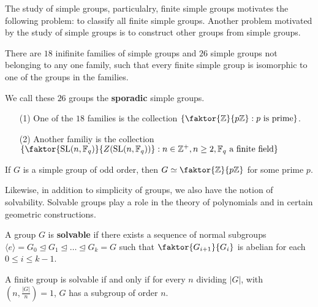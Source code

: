 The study of simple groups, particulalry, finite simple groups motivates the
following problem: to classify all finite simple groups. Another problem
motivated by the study of simple groups is to construct other groups from simple
groups.

\begin{theorem}\label{theorem_3.5.3}
  There are $18$ inifinite families of simple groups and $26$ simple groups
  not belonging to any one family, such that every finite simple group is
  isomorphic to one of the groups in the families.
\end{theorem}
\begin{remark}
  We call these $26$ groups the \textbf{sporadic} simple groups.
\end{remark}

\begin{example}\label{example_3.10}
  \begin{enumerate}
    \item[(1)] One of the $18$ families is the collection
      $\{\faktor{\Z}{p\Z} : p \text{ is prime}\}$.

    \item[(2)] Another familiy is the collection
      $\{\faktor{\SL(n,\F_q)}{Z(\SL(n, \F_q))} : n \in \Z^+, n \geq 2,\F_q \text{
      a finite field} \}$
  \end{enumerate}
\end{example}

\begin{theorem}\label{theorem_3.5.4}
  If $G$ is a simple group of odd order, then $G \simeq \faktor{\Z}{p\Z}$ for
  some prime $p$.
\end{theorem}

Likewise, in addition to simplicity of groups, we also have the notion of
solvability. Solvable groups play a role in the theory of polynomials and in
certain geometric constructions.

\begin{definition}
  A group $G$ is \textbf{solvable} if there exists a sequence of normal
  subgroups $\langle e \rangle=G_0 \unlhd G_1 \unlhd \dots \unlhd G_k=G$ such that
  $\faktor{G_{i+1}}{G_i}$ is abelian for each $0 \leq i \leq k-1$.
\end{definition}

\begin{theorem}\label{theorem_3.5.5}
  A finite group is solvable if and only if for every $n$ dividing
  $|G|$, with $(n,\frac{|G|}{n})=1$, $G$ has a subgroup of order $n$.
\end{theorem}

